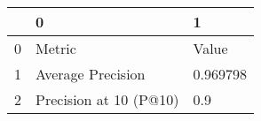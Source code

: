 \begin{tabular}{lll}
\toprule
{} &                       0 &         1 \\
\midrule
0 &                  Metric &     Value \\
1 &       Average Precision &  0.969798 \\
2 &  Precision at 10 (P@10) &       0.9 \\
\bottomrule
\end{tabular}
